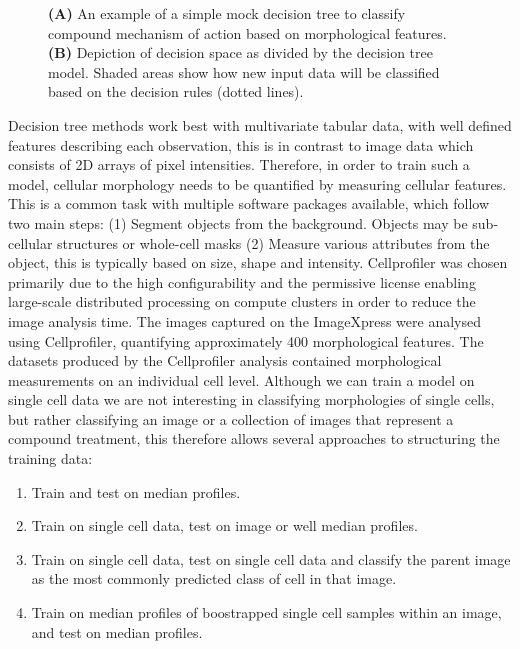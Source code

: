 \documentclass[a4paper,11pt,twoside,openright]{scrbook}
\begin{document}
\begin{figure}
    \captionsetup{width=0.8\textwidth}
    \caption[Diagram of a simple decision tree]{\textbf{(A)} An example of a simple mock decision tree to classify compound mechanism of action based on morphological features. \textbf{(B)} Depiction of decision space as divided by the decision tree model. Shaded areas show how new input data will be classified based on the decision rules (dotted lines).}
    
    \label{figure:decision_tree}
\end{figure}

Decision tree methods work best with multivariate tabular data, with well defined features describing each observation, this is in contrast to image data which consists of 2D arrays of pixel intensities.
Therefore, in order to train such a model, cellular morphology needs to be quantified by measuring cellular features.
This is a common task with multiple software packages available, which follow two main steps: (1) Segment objects from the background. Objects may be sub-cellular structures or whole-cell masks (2) Measure various attributes from the object, this is typically based on size, shape and intensity.
Cellprofiler \cite{Carpenter2006} was chosen primarily due to the high configurability and the permissive license enabling large-scale distributed processing on compute clusters in order to reduce the image analysis time.
The images captured on the ImageXpress were analysed using Cellprofiler, quantifying approximately 400 morphological features.
The datasets produced by the Cellprofiler analysis contained morphological measurements on an individual cell level.
Although we can train a model on single cell data we are not interesting in classifying morphologies of single cells, but rather classifying an image or a collection of images that represent a compound treatment, this therefore allows several approaches to structuring the training data:

\begin{enumerate}
    \item Train and test on median profiles.
    \item Train on single cell data, test on image or well median profiles.
    \item Train on single cell data, test on single cell data and classify the parent image as the most commonly predicted class of cell in that image.
    \item Train on median profiles of boostrapped single cell samples within an image, and test on median profiles.
\end{enumerate}
\end{document}
